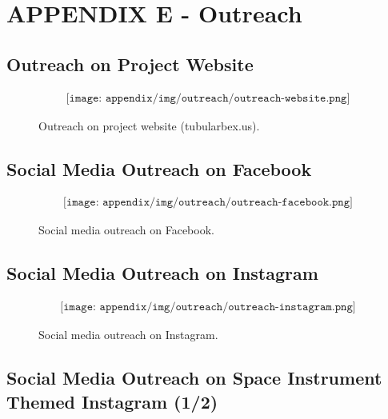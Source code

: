\section{APPENDIX E - Outreach} \label{sec:appE}

\subsection{Outreach on Project Website}

\begin{figure}[H]
    \begin{align*}
        \texttt{[image: appendix/img/outreach/outreach-website.png]}
    \end{align*}
    \caption{Outreach on project website (tubularbex.us).}
    \label{fig:outreach-website}
\end{figure}

\subsection{Social Media Outreach on Facebook}

\begin{figure}[H]
    \begin{align*}
        \texttt{[image: appendix/img/outreach/outreach-facebook.png]}
    \end{align*}
    \caption{Social media outreach on Facebook.}
    \label{fig:outreach-facebook}
\end{figure}

\subsection{Social Media Outreach on Instagram}

\begin{figure}[H]
    \begin{align*}
        \texttt{[image: appendix/img/outreach/outreach-instagram.png]}
    \end{align*}
    \caption{Social media outreach on Instagram.}
    \label{fig:outreach-instagram}
\end{figure}

\subsection{Social Media Outreach on Space Instrument Themed Instagram (1/2)}

